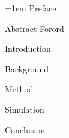 \documentclass{article}
\begin{document}
\emergencystretch=1em
\frontmatter
{Preface}

{Abstract}
{Forord}

\newpage

\singlespacing
\tableofcontents
\doublespacing


\newpage
\listoffigures
\newpage
\printnoidxglossaries

\mainmatter

{Introduction}

{Background}

{Method}

{Simulation}

{Conclusion}




\newpage
\printbibliography[heading = bibintoc, title = References]    %


\end{document}
